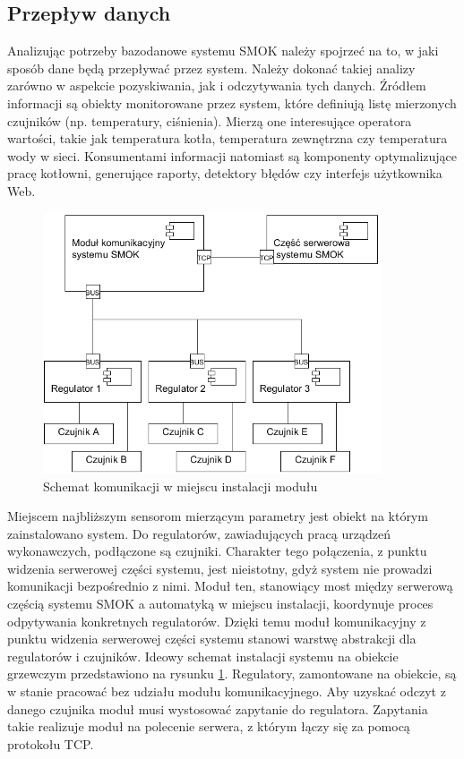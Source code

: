 \documentclass[a4paper,polish,12pt,twoside]{article}
\begin{document}
\subsection{Przepływ danych}

Analizując potrzeby bazodanowe systemu SMOK należy spojrzeć na to, w jaki sposób dane będą przepływać przez system. Należy dokonać takiej analizy zarówno w aspekcie pozyskiwania, jak i odczytywania tych danych. Źródłem informacji są obiekty monitorowane przez system, które definiują listę mierzonych czujników (np. temperatury, ciśnienia). Mierzą one interesujące operatora wartości, takie jak temperatura kotła, temperatura zewnętrzna czy temperatura wody w sieci. Konsumentami informacji natomiast są komponenty optymalizujące pracę kotłowni, generujące raporty, detektory błędów czy interfejs użytkownika Web.

\begin{figure}[h]
	\centering \includegraphics[width=10cm]{smokarc_clientsite}
	\caption{Schemat komunikacji w miejscu instalacji modułu}
	\label{fig:smokarc_clientsite}
\end{figure}

Miejscem najbliższym sensorom mierzącym parametry jest obiekt na którym zainstalowano system. Do regulatorów, zawiadujących pracą urządzeń wykonawczych, podłączone są czujniki. Charakter tego połączenia, z punktu widzenia serwerowej części systemu, jest nieistotny, gdyż system nie prowadzi komunikacji bezpośrednio z nimi. Moduł ten, stanowiący most między serwerową częścią systemu SMOK a automatyką w miejscu instalacji, koordynuje proces odpytywania konkretnych regulatorów. Dzięki temu moduł komunikacyjny z punktu widzenia serwerowej części systemu stanowi warstwę abstrakcji dla regulatorów i czujników. Ideowy schemat instalacji systemu na obiekcie grzewczym przedstawiono na rysunku \ref{fig:smokarc_clientsite}. Regulatory, zamontowane na obiekcie, są w stanie pracować bez udziału modułu komunikacyjnego. Aby uzyskać odczyt z danego czujnika moduł musi wystosować zapytanie do regulatora. Zapytania takie realizuje moduł na polecenie serwera, z którym łączy się za pomocą protokołu TCP.
\end{document}
